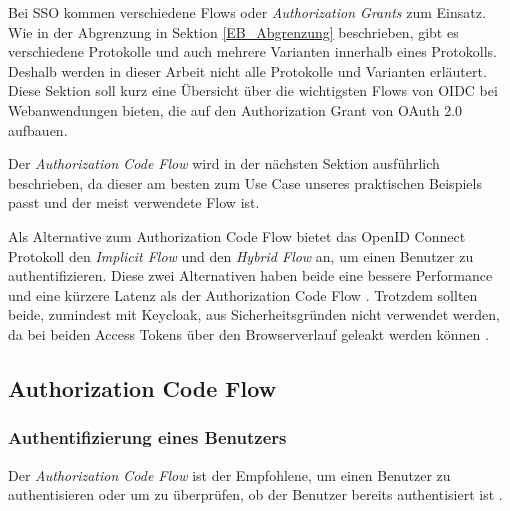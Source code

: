 Bei SSO kommen verschiedene Flows oder \textit{Authorization Grants} zum Einsatz. Wie in der Abgrenzung in Sektion \ref{EB_Abgrenzung} beschrieben, gibt es verschiedene Protokolle und auch mehrere Varianten innerhalb eines Protokolls. Deshalb werden in dieser Arbeit nicht alle Protokolle und Varianten erläutert. Diese Sektion soll kurz eine Übersicht über die wichtigsten Flows von OIDC bei Webanwendungen bieten, die auf den Authorization Grant von OAuth 2.0 aufbauen.


Der \textit{Authorization Code Flow} wird in der nächsten Sektion ausführlich beschrieben, da dieser am besten zum Use Case unseres praktischen Beispiels passt und der meist verwendete Flow ist.

Als Alternative zum Authorization Code Flow bietet das OpenID Connect Protokoll den \textit{Implicit Flow} und den \textit{Hybrid Flow} an, um einen Benutzer zu authentifizieren. Diese zwei Alternativen haben beide eine bessere Performance \cite[Implicit and Hybrid Flow]{EB26} und eine kürzere Latenz als der Authorization Code Flow \cite[Code Flow]{EB20}. Trotzdem sollten beide, zumindest mit Keycloak, aus Sicherheitsgründen nicht verwendet werden, da bei beiden Access Tokens über den Browserverlauf geleakt werden können \cite{EB26} \cite[Implicit  Flow]{keycloakDocs}.

\subsection{Authorization Code Flow}

\subsubsection{Authentifizierung eines Benutzers} \label{EB_Authentifizierung_eines_Benutzers}

Der \textit{Authorization Code Flow} ist der Empfohlene, um einen Benutzer zu authentisieren oder um zu überprüfen, ob der Benutzer bereits authentisiert ist \cite[Authorization Code Flow]{keycloakDocs}. 

